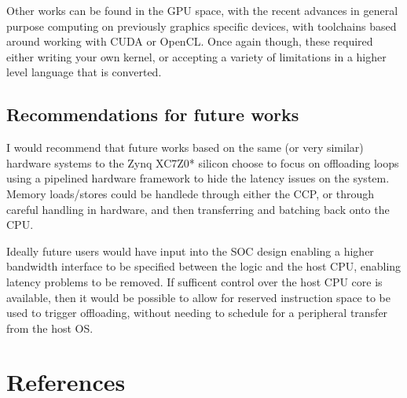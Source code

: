 \documentclass[a4paper]{article}
\begin{document}
Other works can be found in the GPU space, with the recent advances in general purpose computing on previously graphics specific devices, with toolchains based around working with CUDA\cite{cuda} or OpenCL. Once again though, these required either writing your own kernel, or accepting a variety of limitations in a higher level language that is converted.

\subsection{Recommendations for future works}
I would recommend that future works based on the same (or very similar) hardware systems to the Zynq XC7Z0* silicon choose to focus on offloading loops using a pipelined hardware framework to hide the latency issues on the system. Memory loads/stores could be handlede through either the CCP, or through careful handling in hardware, and then transferring and batching back onto the CPU.

Ideally future users would have input into the SOC design enabling a higher bandwidth interface to be specified between the logic and the host CPU, enabling latency problems to be removed. If sufficent control over the host CPU core is available, then it would be possible to allow for reserved instruction space to be used to trigger offloading, without needing to schedule for a peripheral transfer from the host OS.

\section{References}


\end{document}
